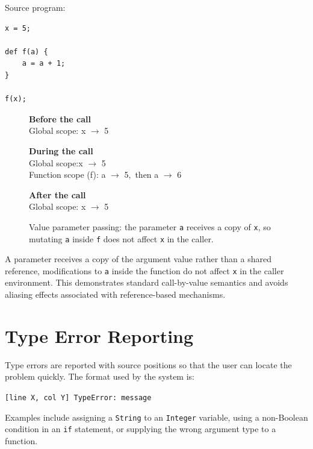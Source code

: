 Source program:

\begin{lstlisting}
x = 5;

def f(a) {
    a = a + 1;
}

f(x);
\end{lstlisting}

\begin{figure}[H]
\centering
\begin{tcolorbox}[colback=codebg, colframe=codeframe, boxrule=0.4pt,
                  left=6pt, right=6pt, top=4pt, bottom=4pt]
\footnotesize\ttfamily
\textbf{Before the call}\\[2pt]
Global scope: \quad x $\rightarrow$ 5

\vspace{0.5em}
\textbf{During the call}\\[2pt]
Global scope:\quad x $\rightarrow$ 5\\
Function scope (f): \quad a $\rightarrow$ 5,\ then a $\rightarrow$ 6

\vspace{0.5em}
\textbf{After the call}\\[2pt]
Global scope: \quad x $\rightarrow$ 5
\end{tcolorbox}
\caption{Value parameter passing: the parameter \texttt{a} receives a copy of
\texttt{x}, so mutating \texttt{a} inside \texttt{f} does not affect
\texttt{x} in the caller.\label{fig:value-param-passing}}
\end{figure}

A parameter receives a copy of the argument value rather than a
shared reference, modifications to \texttt{a} inside the function do not
affect \texttt{x} in the caller environment. This demonstrates standard
call-by-value semantics and avoids aliasing effects associated with
reference-based mechanisms.

\section{Type Error Reporting}
Type errors are reported with source positions so that the user can locate the
problem quickly. The format used by the system is:

\begin{center}
\texttt{[line X, col Y] TypeError: message}
\end{center}

Examples include assigning a \texttt{String} to an \texttt{Integer} variable,
using a non-Boolean condition in an \texttt{if} statement, or supplying the
wrong argument type to a function.

